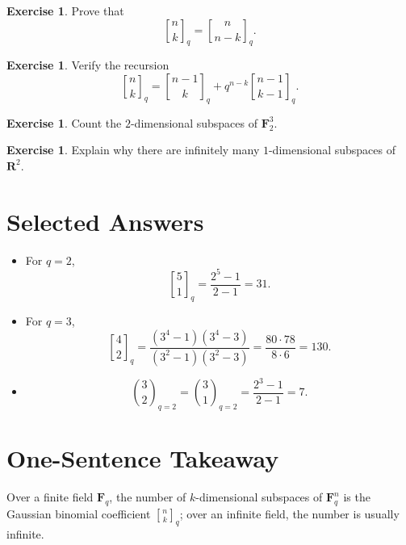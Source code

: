 \documentclass[11pt]{article}
\theoremstyle{definition}
\newtheorem{exercise}[theorem]{Exercise}
\theoremstyle{remark}
\newcommand{\F}{\mathbf{F}}
\newcommand{\R}{\mathbf{R}}
\newcommand{\qbinom}[2]{\genfrac{[}{]}{0pt}{}{#1}{#2}_q}
\begin{document}
	\begin{exercise}
		Prove that
		\[
		\qbinom{n}{k}=\qbinom{n}{n-k}.
		\]
	\end{exercise}
	
	\begin{exercise}
		Verify the recursion
		\[
		\qbinom{n}{k}
		=
		\qbinom{n-1}{k}
		+
		q^{n-k}\qbinom{n-1}{k-1}.
		\]
	\end{exercise}
	
	\begin{exercise}
		Count the \(2\)-dimensional subspaces of \(\F_2^3\).
	\end{exercise}
	
	\begin{exercise}
		Explain why there are infinitely many \(1\)-dimensional subspaces of \(\R^2\).
	\end{exercise}
	
	\section{Selected Answers}
	
	\begin{itemize}
		\item For \(q=2\),
		\[
		\qbinom{5}{1}=\frac{2^5-1}{2-1}=31.
		\]
		
		\item For \(q=3\),
		\[
		\qbinom{4}{2}
		=
		\frac{(3^4-1)(3^4-3)}{(3^2-1)(3^2-3)}
		=
		\frac{80\cdot 78}{8\cdot 6}
		=
		130.
		\]
		
		\item
		\[
		\binom{3}{2}_{q=2}
		=
		\binom{3}{1}_{q=2}
		=
		\frac{2^3-1}{2-1}
		=
		7.
		\]
	\end{itemize}
	
	\section*{One-Sentence Takeaway}
	
	Over a finite field \(\F_q\), the number of \(k\)-dimensional subspaces of \(\F_q^n\) is the Gaussian binomial coefficient \(\qbinom{n}{k}\); over an infinite field, the number is usually infinite.
	
\end{document}
